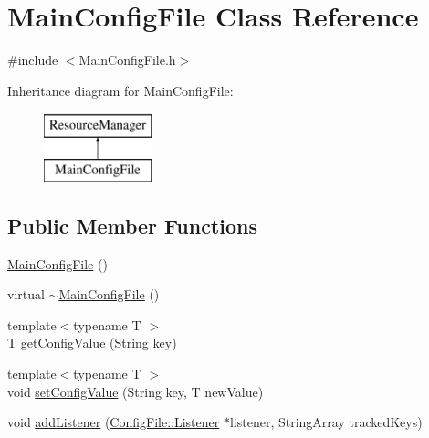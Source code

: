 \hypertarget{classMainConfigFile}{}\section{Main\+Config\+File Class Reference}
\label{classMainConfigFile}


{\ttfamily \#include $<$Main\+Config\+File.\+h$>$}

Inheritance diagram for Main\+Config\+File\+:\begin{figure}[H]
\begin{center}
\leavevmode
\includegraphics[height=2.000000cm]{classMainConfigFile}
\end{center}
\end{figure}
\subsection*{Public Member Functions}
\begin{DoxyCompactItemize}
\item 
\mbox{\hyperlink{classMainConfigFile_af95264a153df021dc5113554d99d7ffa}{Main\+Config\+File}} ()
\item 
virtual \mbox{\hyperlink{classMainConfigFile_a142bd2744550dc97ef0969da0db90e23}{$\sim$\+Main\+Config\+File}} ()
\item 
{\footnotesize template$<$typename T $>$ }\\T \mbox{\hyperlink{classMainConfigFile_ab856604112ebd4364fba1a2bbe3755ed}{get\+Config\+Value}} (String key)
\item 
{\footnotesize template$<$typename T $>$ }\\void \mbox{\hyperlink{classMainConfigFile_a17371ce4c90e5e4ae04a5adbeae6428e}{set\+Config\+Value}} (String key, T new\+Value)
\item 
void \mbox{\hyperlink{classMainConfigFile_a1d1fa50851f5d896f728176a399401d8}{add\+Listener}} (\mbox{\hyperlink{classConfigFile_1_1Listener}{Config\+File\+::\+Listener}} $\ast$listener, String\+Array tracked\+Keys)
\end{DoxyCompactItemize}
